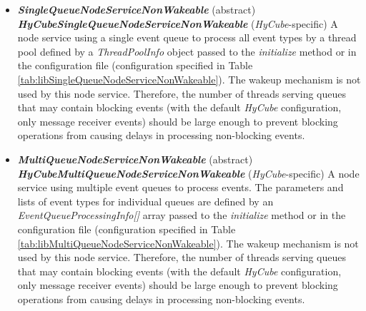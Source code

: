 \begin{itemize}
	\item \textbf{\emph{SingleQueueNodeServiceNonWakeable}} (abstract) \newline \textbf{\emph{HyCubeSingleQueueNodeServiceNonWakeable}} (\emph{HyCube}-specific) \newline A node service using a single event queue to process all event types by a thread pool defined by a \emph{ThreadPoolInfo} object passed to the \emph{initialize} method or in the configuration file (configuration specified in Table \ref{tab:libSingleQueueNodeServiceNonWakeable}). The wakeup mechanism is not used by this node service. Therefore, the number of threads serving queues that may contain blocking events (with the default \emph{HyCube} configuration, only message receiver events) should be large enough to prevent blocking operations from causing delays in processing non-blocking events.
	
	\item \textbf{\emph{MultiQueueNodeServiceNonWakeable}} (abstract) \newline \textbf{\emph{HyCubeMultiQueueNodeServiceNonWakeable}} (\emph{HyCube}-specific) \newline A node service using multiple event queues to process events. The parameters and lists of event types for individual queues are defined by an \emph{EventQueueProcessingInfo[]} array passed to the \emph{initialize} method or in the configuration file (configuration specified in Table \ref{tab:libMultiQueueNodeServiceNonWakeable}). The wakeup mechanism is not used by this node service. Therefore, the number of threads serving queues that may contain blocking events (with the default \emph{HyCube} configuration, only message receiver events) should be large enough to prevent blocking operations from causing delays in processing non-blocking events.
	

\end{itemize}
